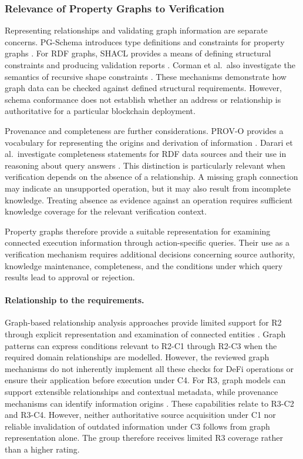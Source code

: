 \subsubsection{Relevance of Property Graphs to Verification}

Representing relationships and validating graph
information are separate concerns. PG-Schema
introduces type definitions and constraints for
property graphs \cite{anglesPGSchema2023}.
For RDF graphs, SHACL provides a means of defining
structural constraints and producing validation
reports \cite{w3cSHACL2017}. Corman et al.\
also investigate the semantics of recursive shape
constraints \cite{cormanRecursiveSHACL2018}. These mechanisms demonstrate how graph data can
be checked against defined structural requirements.
However, schema conformance does not establish
whether an address or relationship is authoritative
for a particular blockchain deployment.

Provenance and completeness are further considerations.
PROV-O provides a vocabulary for representing the
origins and derivation of information
\cite{w3cPROVO2013}. Darari et al.\ investigate
completeness statements for RDF data sources and
their use in reasoning about query answers
\cite{darariCompletenessRDF2018}. This distinction is particularly relevant when
verification depends on the absence of a relationship.
A missing graph connection may indicate an unsupported
operation, but it may also result from incomplete
knowledge. Treating absence as evidence against an
operation requires sufficient knowledge coverage
for the relevant verification context.

Property graphs therefore provide a suitable
representation for examining connected execution
information through action-specific queries.
Their use as a verification mechanism requires
additional decisions concerning source authority,
knowledge maintenance, completeness, and the
conditions under which query results lead to
approval or rejection.

\paragraph{Relationship to the requirements.}

Graph-based relationship analysis approaches provide
limited support for R2 through explicit representation
and examination of connected entities
\cite{anglesPropertyGraphModel2018,francisCypher2018}.
Graph patterns can express conditions relevant to
R2-C1 through R2-C3 when the required domain
relationships are modelled. However, the reviewed
graph mechanisms do not inherently implement all
these checks for DeFi operations or ensure their
application before execution under C4. For R3, graph models can support extensible
relationships and contextual metadata, while
provenance mechanisms can identify information origins
\cite{hoganKnowledgeGraphs2021,w3cPROVO2013}.
These capabilities relate to R3-C2 and R3-C4.
However, neither authoritative source acquisition
under C1 nor reliable invalidation of outdated
information under C3 follows from graph representation
alone. The group therefore receives limited R3
coverage rather than a higher rating.

